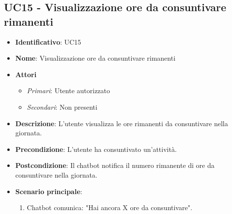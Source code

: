 \subsection{UC15 - Visualizzazione ore da consuntivare rimanenti }
\begin{itemize}
	\item \textbf{Identificativo}: UC15
	\item \textbf{Nome}: Visualizzazione ore da consuntivare rimanenti
	\item \textbf{Attori}
	\begin{itemize} 
		\item \textit{Primari}: Utente autorizzato
		\item \textit{Secondari}: Non presenti
	\end{itemize}
	\item \textbf{Descrizione}: L'utente visualizza le ore rimanenti da consuntivare nella giornata.
	\item \textbf{Precondizione}: L'utente ha consuntivato un'attività.
	\item \textbf{Postcondizione}: Il chatbot notifica il numero rimanente di ore da consuntivare nella giornata.
	\item \textbf{Scenario principale}: \begin{enumerate}
		\item Chatbot comunica: "Hai ancora X ore da consuntivare".
	\end{enumerate}
\end{itemize}
